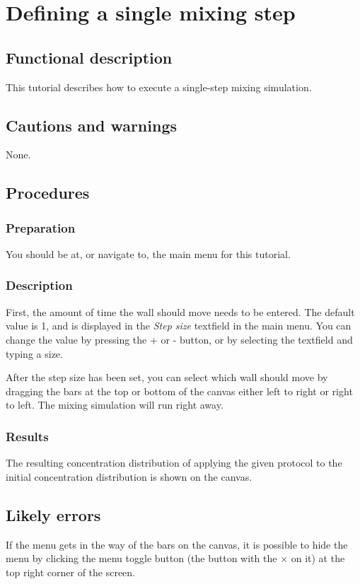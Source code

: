 \section{Defining a single mixing step}
\label{sec:singleStepMix}

\subsection{Functional description}
This tutorial describes how to execute a single-step mixing simulation.

\subsection{Cautions and warnings}
None.

\subsection{Procedures}
\subsubsection{Preparation}
You should be at, or navigate to, the main menu for this tutorial.

\subsubsection{Description}
First, the amount of time the wall should move needs to be entered. The default value is 1, and is displayed in the \emph{Step size} textfield in the main menu. You can change the value by pressing the + or - button, or by selecting the textfield and typing a size.

After the step size has been set, you can select which wall should move by dragging the bars at the top or bottom of the canvas either left to right or right to left. The mixing simulation will run right away.

\subsubsection{Results}
The resulting concentration distribution of applying the given protocol to the initial concentration distribution is shown on the canvas.

\subsection{Likely errors}
If the menu gets in the way of the bars on the canvas, it is possible to hide the menu by clicking the menu toggle button (the button with the $\times$ on it) at the top right corner of the screen.

